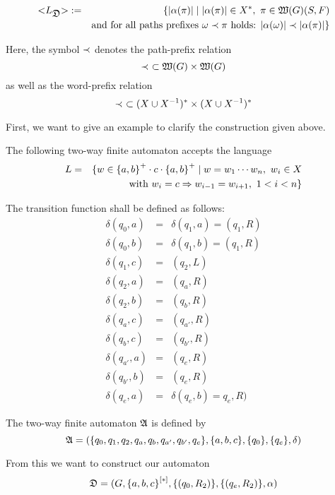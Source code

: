 \begin{definition}
\begin{eqnarray*}
\mbox{${<}{L_{\mbox{$\mathfrak{D}$}}}{>}$} &:=& \{ |\alpha(\pi)| \mid  |\alpha(\pi)| \in
X^*,\ \pi \in \mbox{$\mathfrak{W}({G})$}(S, F) \\
&& \text{and for all paths prefixes }\omega \prec \pi \text{ holds: }
|\alpha(\omega)| \prec |\alpha(\pi)| \}
\end{eqnarray*}

Here, the symbol $\prec$ denotes the path-prefix relation
\[ \prec\ \subset \mbox{$\mathfrak{W}({G})$} \times \mbox{$\mathfrak{W}({G})$} \]
as well as the word-prefix relation
\[ \prec\ \subset (X \cup {X}^{-1})^* \times (X \cup {X}^{-1})^* \]
\end{definition}

First, we want to give an example to clarify the construction given above.

The following two-way finite automaton accepts the language
\begin{eqnarray*}
L &=& \{ w \in \mbox{$\{a, b\}$}^+ \cdot c \cdot \mbox{$\{a, b\}$}^+ \mid w = w_1 \cdots
w_n,\ w_i \in X \\
&& \text{ with } w_i = c \Rightarrow w_{i-1} = w_{i+1},\ 1 < i < n \}
\end{eqnarray*} 

The transition function shall be defined as follows:
\begin{eqnarray*}
\delta(q_0, a) &=& \delta(q_1, a) = (q_1, R) \\
\delta(q_0, b) &=& \delta(q_1, b) = (q_1, R) \\
\delta(q_1, c) &=& (q_2, L) \\
\delta(q_2, a) &=& (q_a, R) \\
\delta(q_2, b) &=& (q_b, R) \\
\delta(q_a, c) &=& (q_{a'}, R) \\
\delta(q_b, c) &=& (q_{b'}, R) \\
\delta(q_{a'}, a) &=& (q_e, R) \\
\delta(q_{b'}, b) &=& (q_e, R) \\
\delta(q_{e}, a) &=& \delta(q_e, b) = q_e, R)
\end{eqnarray*}

The two-way finite automaton $\mbox{$\mathfrak{A}$}$ is defined by
\[ \mbox{$\mathfrak{A}$} = (\mbox{$\{q_0, q_1, q_2, q_a, q_b, q_{a'}, q_{b'}, q_e\}$}, \mbox{$\{a,
b, c\}$}, \mbox{$\{q_0\}$}, \mbox{$\{q_e\}$}, \delta) \]

From this we want to construct our automaton 
\[ \mbox{$\mathfrak{D}$} = (G, \mbox{${\mbox{$\{a, b, c\}$}}^{[*]}$}, \mbox{$\{(q_0, R_2)\}$}, \mbox{$\{(q_e,
R_2)\}$}, \alpha) \]


